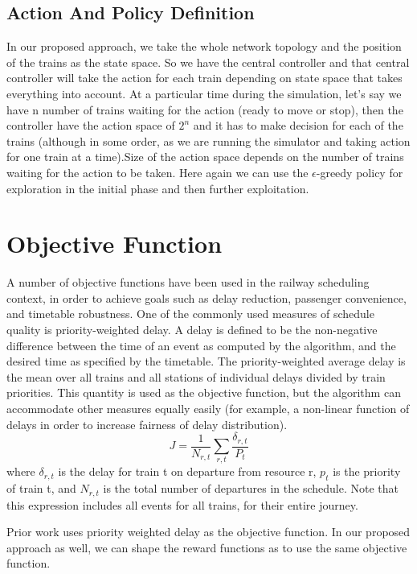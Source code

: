 \subsection{Action And Policy Definition}

In our proposed approach, we take the whole network topology and the position of the trains as the 
state space. So we have the central controller and that central controller will take the action for each train depending on 
state space that takes everything into account. 
At a particular time during the simulation, let's say we have n number of trains waiting for the 
action (ready to move or stop), then the controller have the action space of $2^n$ and it has to 
make decision for each of the trains (although in some order, as we are running the simulator and taking action 
for one train at a time).Size of the action space depends on the number of trains waiting for the 
action to be taken. Here again we can use the $\epsilon$-greedy policy for exploration in the initial phase
and then further exploitation.

\section {Objective Function}
A number of objective functions have been used in the
railway scheduling context, in order to achieve goals such
as delay reduction, passenger convenience, and timetable
robustness. One of the commonly used measures of
schedule quality is priority-weighted delay. A delay is
defined to be the non-negative difference between the time
of an event as computed by the algorithm, and the desired
time as specified by the timetable. The priority-weighted
average delay is the mean over all trains and all stations
of individual delays divided by train priorities. This quantity
is used as the objective function, but the algorithm can
accommodate other measures equally easily (for example,
a non-linear function of delays in order to increase fairness
of delay distribution).
$$ J = \frac{1}{N_{r,t}} \sum_{r,t} \frac{\delta_{r,t}}{P_t} $$
where $\delta_{r,t}$ is the delay for train t on departure from resource r,
$p_t$ is the priority of train t, and $N_{r,t}$ is the total number of
departures in the schedule. Note that this expression includes
all events for all trains, for their entire journey.

Prior work uses priority weighted delay as the objective function. In our proposed 
approach as well, we can shape the reward functions as to use the same
objective function.
